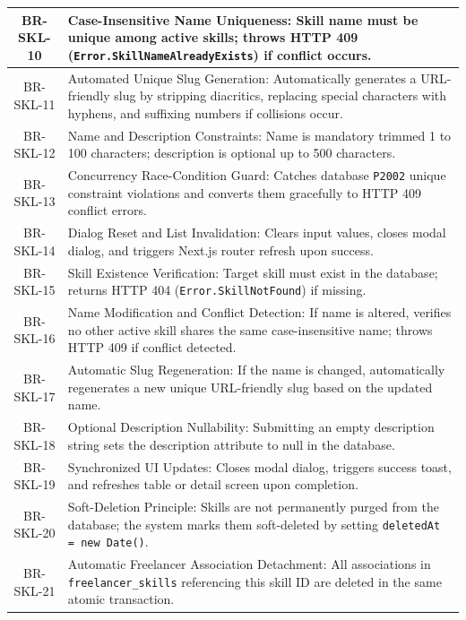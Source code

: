 \begin{longtable}{|c|p{12cm}|}
    BR-SKL-10 & Case-Insensitive Name Uniqueness: Skill name must be unique among active skills; throws HTTP 409 (\texttt{Error.\allowbreak Skill\allowbreak Name\allowbreak Already\allowbreak Exists}) if conflict occurs. \\ \hline
    BR-SKL-11 & Automated Unique Slug Generation: Automatically generates a URL-friendly slug by stripping diacritics, replacing special characters with hyphens, and suffixing numbers if collisions occur. \\ \hline
    BR-SKL-12 & Name and Description Constraints: Name is mandatory trimmed 1 to 100 characters; description is optional up to 500 characters. \\ \hline
    BR-SKL-13 & Concurrency Race-Condition Guard: Catches database \texttt{P2002} unique constraint violations and converts them gracefully to HTTP 409 conflict errors. \\ \hline
    BR-SKL-14 & Dialog Reset and List Invalidation: Clears input values, closes modal dialog, and triggers Next.js router refresh upon success. \\ \hline
    BR-SKL-15 & Skill Existence Verification: Target skill must exist in the database; returns HTTP 404 (\texttt{Error.\allowbreak Skill\allowbreak Not\allowbreak Found}) if missing. \\ \hline
    BR-SKL-16 & Name Modification and Conflict Detection: If name is altered, verifies no other active skill shares the same case-insensitive name; throws HTTP 409 if conflict detected. \\ \hline
    BR-SKL-17 & Automatic Slug Regeneration: If the name is changed, automatically regenerates a new unique URL-friendly slug based on the updated name. \\ \hline
    BR-SKL-18 & Optional Description Nullability: Submitting an empty description string sets the description attribute to null in the database. \\ \hline
    BR-SKL-19 & Synchronized UI Updates: Closes modal dialog, triggers success toast, and refreshes table or detail screen upon completion. \\ \hline
    BR-SKL-20 & Soft-Deletion Principle: Skills are not permanently purged from the database; the system marks them soft-deleted by setting \texttt{deletedAt = new Date()}. \\ \hline
    BR-SKL-21 & Automatic Freelancer Association Detachment: All associations in \texttt{freelancer\_skills} referencing this skill ID are deleted in the same atomic transaction. \\ \hline

\end{longtable}
